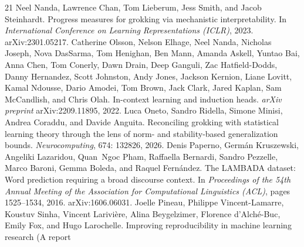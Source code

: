 \documentclass[11pt]{article}
\theoremstyle{plain}
\theoremstyle{definition}
\begin{document}
\begin{thebibliography}{21}
\newblock {}
Neel Nanda, Lawrence Chan, Tom Lieberum, Jess Smith, and Jacob Steinhardt.
\newblock Progress measures for grokking via mechanistic interpretability.
\newblock In \emph{International Conference on Learning Representations
  (ICLR)}, 2023.
\newblock arXiv:2301.05217.
\newblock {}
Catherine Olsson, Nelson Elhage, Neel Nanda, Nicholas Joseph, Nova DasSarma,
  Tom Henighan, Ben Mann, Amanda Askell, Yuntao Bai, Anna Chen, Tom Conerly,
  Dawn Drain, Deep Ganguli, Zac {Hatfield-Dodds}, Danny Hernandez, Scott
  Johnston, Andy Jones, Jackson Kernion, Liane Lovitt, Kamal Ndousse, Dario
  Amodei, Tom Brown, Jack Clark, Jared Kaplan, Sam McCandlish, and Chris Olah.
\newblock In-context learning and induction heads.
\newblock \emph{arXiv preprint} arXiv:2209.11895, 2022.
\newblock {}
Luca Oneto, Sandro Ridella, Simone Minisi, Andrea Coraddu, and Davide Anguita.
\newblock Reconciling grokking with statistical learning theory through the lens
  of norm- and stability-based generalization bounds.
\newblock \emph{Neurocomputing}, 674: 132826, 2026.
\newblock {}
Denis Paperno, Germ{\'a}n Kruszewski, Angeliki Lazaridou, Quan~Ngoc Pham,
  Raffaella Bernardi, Sandro Pezzelle, Marco Baroni, Gemma Boleda, and Raquel
  Fern{\'a}ndez.
\newblock The {LAMBADA} dataset: Word prediction requiring a broad discourse
  context.
\newblock In \emph{Proceedings of the 54th Annual Meeting of the Association
  for Computational Linguistics (ACL)}, pages 1525--1534, 2016.
  arXiv:1606.06031.
\newblock {}
Joelle Pineau, Philippe Vincent-Lamarre, Koustuv Sinha, Vincent Larivi{\`e}re,
  Alina Beygelzimer, Florence {d'Alch{\'e}-Buc}, Emily Fox, and Hugo
  Larochelle.
\newblock Improving reproducibility in machine learning research ({A} report

\end{thebibliography}
\end{document}
